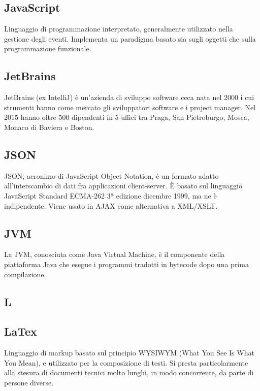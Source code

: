 \subsection{JavaScript}
Linguaggio di programmazione interpretato, generalmente utilizzato nella gestione
degli eventi. Implementa un paradigma basato sia sugli oggetti che sulla programmazione
funzionale.

\subsection{JetBrains}
JetBrains (ex IntelliJ) è un'azienda di sviluppo software ceca nata nel 2000 i cui strumenti hanno come mercato gli sviluppatori software e i project manager. Nel 2015 hanno oltre 500 dipendenti in 5 uffici tra Praga, San Pietroburgo, Mosca, Monaco di Baviera e Boston.

\subsection{JSON}
JSON, acronimo di JavaScript Object Notation, è un formato adatto all'interscambio di dati fra applicazioni client-server. È basato sul linguaggio JavaScript Standard ECMA-262 3ª edizione dicembre 1999, ma ne è indipendente. Viene usato in AJAX come alternativa a XML/XSLT.

\subsection{JVM}
La JVM, conosciuta come Java Virtual Machine, è il componente della piattaforma Java che esegue i programmi tradotti in bytecode dopo una prima compilazione.

\newpage

\begin{center}
\Huge\section{\uppercase{L}}
\end{center}

\subsection{LaTex}
Linguaggio di markup basato sul principio WYSIWYM (What You See Is What You
Mean), e utilizzato per la composizione di testi. Si presta particolarmente alla stesura di
documenti tecnici molto lunghi, in modo concorrente, da parte di persone diverse.

